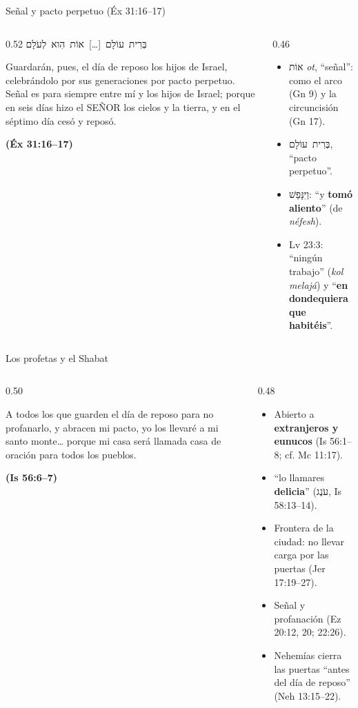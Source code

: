 \documentclass[hyperref={bookmarks=false},aspectratio=169]{beamer}
\newcommand{\heb}[1]{\mbox{\foreignlanguage{hebrew}{#1}}}
\newcommand{\SENOR}{S{\fontsize{0.78em}{1em}\selectfont EÑOR}}
\newcommand{\fuente}[1]{\par\hfill{\upshape\bfseries\footnotesize\textcolor{tierraroja}{#1}}}
\newcommand{\destacar}[1]{\textbf{\textcolor{tierraroja}{#1}}}
\begin{document}
\begin{frame}{Señal y pacto perpetuo (Éx 31:16--17)}
\begin{columns}[c,onlytextwidth]
\begin{column}{0.52\textwidth}
\centering\scriptsize\heb{בְּרִית עוֹלָם \foreignlanguage{spanish}{[\ldots]} אוֹת הִוא לְעֹלָם}
\begin{cita}Guardarán, pues, el día de reposo los hijos de Israel, celebrándolo por sus generaciones por pacto perpetuo. Señal es para siempre entre mí y los hijos de Israel; porque en seis días hizo el \SENOR{} los cielos y la tierra, y en el séptimo día cesó y reposó.\fuente{(Éx 31:16--17)}\end{cita}
\end{column}
\begin{column}{0.46\textwidth}\small
\begin{itemize}
\item \heb{אוֹת} \emph{ot}, ``señal'': como el arco (Gn 9) y la circuncisión (Gn 17).
\item \heb{בְּרִית עוֹלָם}, ``pacto perpetuo''.
\item \heb{וַיִּנָּפַשׁ}: ``y \destacar{tomó aliento}'' (de \emph{néfesh}).
\item Lv 23:3: ``ningún trabajo'' (\emph{kol melajá}) y ``\destacar{en dondequiera que habitéis}''.
\end{itemize}
\end{column}
\end{columns}
\end{frame}

\begin{frame}{Los profetas y el Shabat}
\begin{columns}[t,onlytextwidth]
\begin{column}{0.50\textwidth}
\begin{cita}A todos los que guarden el día de reposo para no profanarlo, y abracen mi pacto, yo los llevaré a mi santo monte\ldots{} porque mi casa será llamada casa de oración para todos los pueblos.\fuente{(Is 56:6--7)}\end{cita}
\end{column}
\begin{column}{0.48\textwidth}\scriptsize
\begin{itemize}
\item Abierto a \destacar{extranjeros y eunucos} (Is 56:1--8; cf. Mc 11:17).
\item ``lo llamares \destacar{delicia}'' (\heb{עֹנֶג}, Is 58:13--14).
\item Frontera de la ciudad: no llevar carga por las puertas (Jer 17:19--27).
\item Señal y profanación (Ez 20:12, 20; 22:26).
\item Nehemías cierra las puertas ``antes del día de reposo'' (Neh 13:15--22).
\end{itemize}
\end{column}
\end{columns}
\end{frame}
\end{document}
